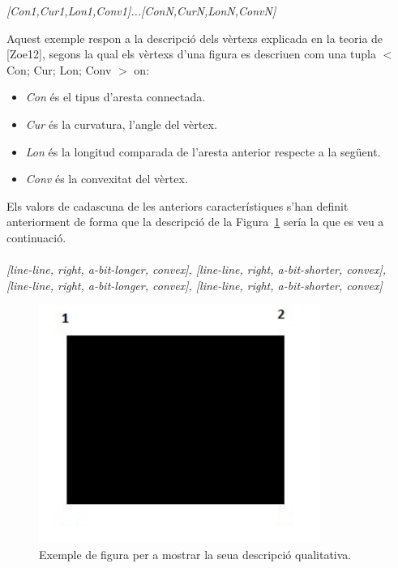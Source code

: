 \documentclass{article}
\begin{document}
\begin{center}
\emph{[Con1,Cur1,Lon1,Conv1]...[ConN,CurN,LonN,ConvN]}
\end{center}

Aquest exemple respon a la descripció dels vèrtexs explicada en la teoria de [Zoe12], segons la qual els vèrtexs d'una figura es descriuen com una tupla $<$ Con; Cur; Lon; Conv $>$ on:

\begin{itemize}
\item \emph{Con} és el tipus d'aresta connectada.
\item \emph{Cur} és la curvatura, l'angle del vèrtex.
\item \emph{Lon} és la longitud comparada de l'aresta anterior respecte a la següent.
\item \emph{Conv} és la convexitat del vèrtex.
\end{itemize}

Els valors de cadascuna de les anteriors característiques s'han definit anteriorment de forma que la descripció de la Figura~\ref{fig:exemple} sería la que es veu a continuació.
\\
\\
\emph{[line-line, right, a-bit-longer, convex], [line-line, right, a-bit-shorter, convex], [line-line, right, a-bit-longer, convex], [line-line, right, a-bit-shorter, convex]}

\begin{figure}[h]
\centering
\includegraphics[width=260pt]{images/quad_gran.jpg}
\caption {Exemple de figura per a mostrar la seua descripció qualitativa.}
\label {fig:exemple}
\end{figure}
\end{document}
